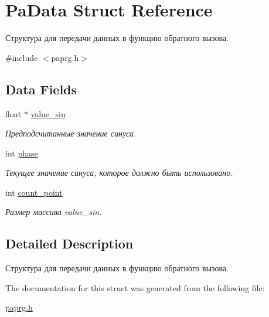 \hypertarget{struct_pa_data}{}\section{Pa\+Data Struct Reference}
\label{struct_pa_data}


Структура для передачи данных в функцию обратного вызова.  




{\ttfamily \#include $<$paprg.\+h$>$}

\subsection*{Data Fields}
\begin{DoxyCompactItemize}
\item 
\mbox{\label{struct_pa_data_a0027bf1f0167a3fa61bcfde93c67d675}} 
float $\ast$ \hyperlink{struct_pa_data_a0027bf1f0167a3fa61bcfde93c67d675}{value\+\_\+sin}
\begin{DoxyCompactList}\small\item\em Предподсчитанные значение синуса. \end{DoxyCompactList}\item 
\mbox{\label{struct_pa_data_accf3aec63bc20b3c99ab4881cb07c05b}} 
int \hyperlink{struct_pa_data_accf3aec63bc20b3c99ab4881cb07c05b}{phase}
\begin{DoxyCompactList}\small\item\em Текущее значение синуса, которое должно быть использовано. \end{DoxyCompactList}\item 
\mbox{\label{struct_pa_data_a13220bd9b66d52addf0aa5946beaf725}} 
int \hyperlink{struct_pa_data_a13220bd9b66d52addf0aa5946beaf725}{count\+\_\+point}
\begin{DoxyCompactList}\small\item\em Размер массива value\+\_\+sin. \end{DoxyCompactList}\end{DoxyCompactItemize}


\subsection{Detailed Description}
Структура для передачи данных в функцию обратного вызова. 

The documentation for this struct was generated from the following file\+:\begin{DoxyCompactItemize}
\item 
\hyperlink{paprg_8h}{paprg.\+h}\end{DoxyCompactItemize}

